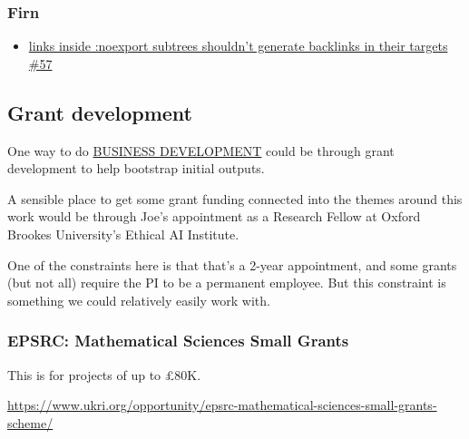 \documentclass[11pt]{article}
\begin{document}
\subsubsection{Firn}
\label{sec:org80362fa}

\begin{itemize}
\item \href{https://github.com/theiceshelf/firn/issues/57}{links inside :noexport subtrees shouldn't generate backlinks in their targets \#57}
\end{itemize}
\subsection{Grant development}
\label{sec:orgfcd2c84}

One way to do \hyperref[sec:org8c3f18e]{BUSINESS DEVELOPMENT} could be through grant development
to help bootstrap initial outputs.

A sensible place to get some grant funding connected into the themes
around this work would be through Joe’s appointment as a Research
Fellow at Oxford Brookes University’s Ethical AI Institute.

One of the constraints here is that that’s a 2-year appointment, and
some grants (but not all) require the PI to be a permanent employee.
But this constraint is something we could relatively easily work with.

\subsubsection{EPSRC: Mathematical Sciences Small Grants}
\label{sec:orgf015668}

This is for projects of up to £80K.

\url{https://www.ukri.org/opportunity/epsrc-mathematical-sciences-small-grants-scheme/}
\end{document}
